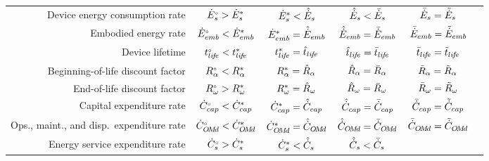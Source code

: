 \begin{landscape}
\begin{table}
\begin{tabular}{r c c c c c}
%
Device energy consumption rate    & ${}{\dot{E}}^{\scriptscriptstyle \circ}_s  > {\dot{E}}^*_s$
                                  & ${\dot{E}}^*_s   < \hat{\dot{E}}_s$ 
                                  & $\hat{\dot{E}}_s   < \bar{\dot{E}}_s$ 
                                  & $\bar{\dot{E}}_s = \tilde{\dot{E}}_s$ \\
%
Embodied energy rate              & ${}{\dot{E}}^{\scriptscriptstyle \circ}_{emb}  < {\dot{E}}^*_{emb}$ 
                                  & ${\dot{E}}^*_{emb}   = \hat{\dot{E}}_{emb}$ 
                                  & $\hat{\dot{E}}_{emb}   = \bar{\dot{E}}_{emb}$ 
                                  & $\bar{\dot{E}}_{emb} = \tilde{\dot{E}}_{emb}$ \\
%
Device lifetime                   & ${}{t}^{\scriptscriptstyle \circ}_{li\!f\!e}  < {t}^*_{li\!f\!e}$ 
                                  & ${t}^*_{li\!f\!e}   = \hat{t}_{li\!f\!e}$ 
                                  & $\hat{t}_{li\!f\!e}   = \bar{t}_{li\!f\!e}$ 
                                  & $\bar{t}_{li\!f\!e} = \tilde{t}_{li\!f\!e}$ \\
%
Beginning-of-life discount factor & ${}{R}^{\scriptscriptstyle \circ}_\alpha  < {R}^*_\alpha$ 
                                  & ${R}^*_\alpha   = \hat{R}_\alpha$ 
                                  & $\hat{R}_\alpha   = \bar{R}_\alpha$ 
                                  & $\bar{R}_\alpha = \tilde{R}_\alpha$ \\
%
End-of-life discount factor       & ${}{R}^{\scriptscriptstyle \circ}_\omega  > {R}^*_\omega$
                                  & ${R}^*_\omega   = \hat{R}_\omega$
                                  & $\hat{R}_\omega   = \bar{R}_\omega$
                                  & $\bar{R}_\omega = \tilde{R}_\omega$ \\
%
Capital expenditure rate          & ${}{\dot{C}}^{\scriptscriptstyle \circ}_{cap}  < {\dot{C}}^*_{cap}$ 
                                  & ${\dot{C}}^*_{cap}   = \hat{\dot{C}}_{cap}$ 
                                  & $\hat{\dot{C}}_{cap}   = \bar{\dot{C}}_{cap}$ 
                                  & $\bar{\dot{C}}_{cap} = \tilde{\dot{C}}_{cap}$ \\
%
Ops., maint., and disp.\ expenditure rate & ${}{\dot{C}}^{\scriptscriptstyle \circ}_{O\!M\!d} < {\dot{C}}^*_{O\!M\!d}$ 
                                  & ${\dot{C}}^*_{O\!M\!d}   = \hat{\dot{C}}_{O\!M\!d}$ 
                                  & $\hat{\dot{C}}_{O\!M\!d}   = \bar{\dot{C}}_{O\!M\!d}$ 
                                  & $\bar{\dot{C}}_{O\!M\!d} = \tilde{\dot{C}}_{O\!M\!d}$ \\
%
Energy service expenditure rate   & ${}{\dot{C}}^{\scriptscriptstyle \circ}_s  > {\dot{C}}^*_s$
                                  & ${\dot{C}}^*_s   < \hat{\dot{C}}_s$ 
                                  & $\hat{\dot{C}}_s   < \bar{\dot{C}}_s$ 

\end{tabular}
\end{table}
\end{landscape}
